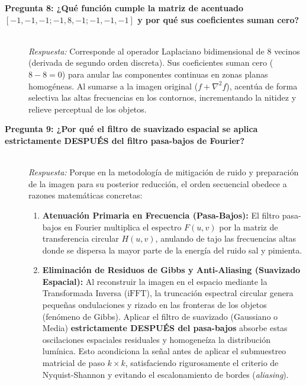 \documentclass{article}
\begin{document}
\begin{description}
    \item[\textbf{Pregunta 8: ¿Qué función cumple la matriz de acentuado $[-1, -1, -1; -1, 8, -1; -1, -1, -1]$ y por qué sus coeficientes suman cero?}]~\\
    \textit{Respuesta:} Corresponde al operador Laplaciano bidimensional de 8 vecinos (derivada de segundo orden discreta). Sus coeficientes suman cero ($8 - 8 = 0$) para anular las componentes continuas en zonas planas homogéneas. Al sumarse a la imagen original ($f + \nabla^2 f$), acentúa de forma selectiva las altas frecuencias en los contornos, incrementando la nitidez y relieve perceptual de los objetos.

    \item[\textbf{Pregunta 9: ¿Por qué el filtro de suavizado espacial se aplica estrictamente DESPUÉS del filtro pasa-bajos de Fourier?}]~\\
    \textit{Respuesta:} Porque en la metodología de mitigación de ruido y preparación de la imagen para su posterior reducción, el orden secuencial obedece a razones matemáticas concretas:
    \begin{enumerate}
        \item \textbf{Atenuación Primaria en Frecuencia (Pasa-Bajos):} El filtro pasa-bajos en Fourier multiplica el espectro $F(u, v)$ por la matriz de transferencia circular $H(u, v)$, anulando de tajo las frecuencias altas donde se dispersa la mayor parte de la energía del ruido sal y pimienta.
        \item \textbf{Eliminación de Residuos de Gibbs y Anti-Aliasing (Suavizado Espacial):} Al reconstruir la imagen en el espacio mediante la Transformada Inversa ($\text{iFFT}$), la truncación espectral circular genera pequeñas ondulaciones y rizado en las fronteras de los objetos (fenómeno de Gibbs). Aplicar el filtro de suavizado (Gaussiano o Media) \textbf{estrictamente DESPUÉS del pasa-bajos} absorbe estas oscilaciones espaciales residuales y homogeneíza la distribución lumínica. Esto acondiciona la señal antes de aplicar el submuestreo matricial de paso $k \times k$, satisfaciendo rigurosamente el criterio de Nyquist-Shannon y evitando el escalonamiento de bordes (\textit{aliasing}).
    \end{enumerate}


\end{description}
\end{document}
